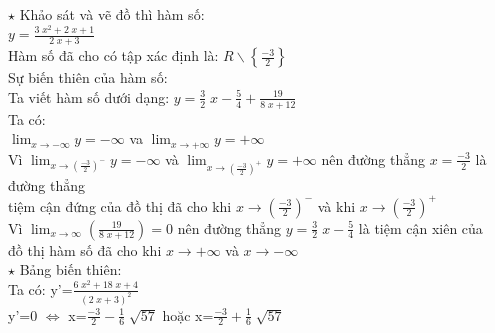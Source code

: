 \documentclass[17pt]{extarticle}
\begin{document}
\everymath{\displaystyle}
$\star$ Khảo sát và vẽ đồ thì hàm số: \\
$y=\frac{3 \; x^{2} + 2 \; x + 1}{2 \; x + 3}$\\
 Hàm số đã cho có tập xác định là: $R\backslash\left\{\frac{-3}{2}\right\}$\\
 Sự biến thiên của hàm số:\\
	Ta viết hàm số dưới dạng: $y=\frac{3}{2} \; x - \frac{5}{4}+\frac{19}{8 \; x + 12}$\\
 Ta có: \\
$\lim_{x\to -\infty }y=-\infty$ va $\lim_{x\to+\infty }y=+\infty$\\
 Vì $\lim_{x\to(\frac{-3}{2})^{-} }y=-\infty$ và $\lim_{x\to(\frac{-3}{2})^{+} }y=+\infty$ nên đường thẳng $x=\frac{-3}{2}$ là đường thẳng\\
tiệm cận đứng của đồ thị đã cho khi $x\to(\frac{-3}{2})^{-}$ và khi $x\to(\frac{-3}{2})^{+}$\\
 Vì $\lim_{x\to\infty}(\frac{19}{8 \; x + 12})=0$ nên đường thẳng $y=\frac{3}{2} \; x - \frac{5}{4}$ là tiệm cận xiên của\\
 đồ thị hàm số đã cho khi $x\to+\infty$ và $x\to-\infty$\\
$\star$ Bảng biến thiên:\\
 Ta có: y'=$\frac{6 \; x^{2} + 18 \; x + 4}{\left(2 \; x + 3\right)^{2}}$ \\
	y'=0 $\Leftrightarrow$ x=$\frac{-3}{2} - \frac{1}{6} \; \sqrt{57}$ hoặc x=$\frac{-3}{2} + \frac{1}{6} \; \sqrt{57}$ \\
\end{document}
